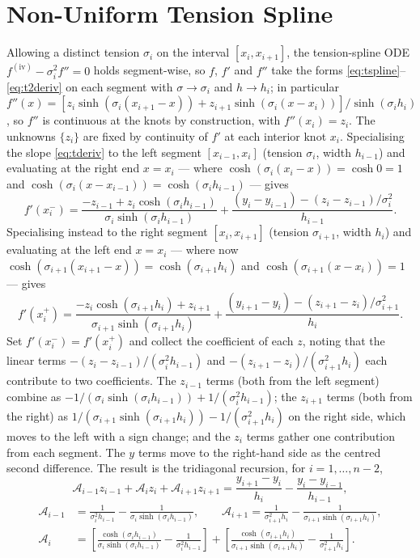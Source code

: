 \documentclass[]{interact}
\theoremstyle{plain}
\begin{document}
\section{Non-Uniform Tension Spline}\label{app:nonunif}
Allowing a distinct tension $\sigma_i$ on the interval $[x_i,x_{i+1}]$, the tension-spline ODE
$f^{(\mathrm{iv})}-\sigma_i^2 f''=0$ holds segment-wise, so $f$, $f'$ and $f''$ take the forms
\eqref{eq:tspline}--\eqref{eq:t2deriv} on each segment with $\sigma\!\to\!\sigma_i$ and
$h\!\to\!h_i$; in particular $f''(x)=[z_i\sinh(\sigma_i(x_{i+1}-x))+z_{i+1}\sinh(\sigma_i(x-x_i))]/\sinh(\sigma_i h_i)$,
so $f''$ is continuous at the knots by construction, with $f''(x_i)=z_i$. The unknowns
$\{z_i\}$ are fixed by continuity of $f'$ at each interior knot $x_i$. Specialising the slope
\eqref{eq:tderiv} to the left segment $[x_{i-1},x_i]$ (tension $\sigma_i$, width $h_{i-1}$) and
evaluating at the right end $x=x_i$ --- where $\cosh(\sigma_i(x_i-x))=\cosh 0=1$ and
$\cosh(\sigma_i(x-x_{i-1}))=\cosh(\sigma_i h_{i-1})$ --- gives
\[
f'(x_i^-)=\frac{-z_{i-1}+z_i\cosh(\sigma_i h_{i-1})}{\sigma_i\sinh(\sigma_i h_{i-1})}
+\frac{(y_i-y_{i-1})-(z_i-z_{i-1})/\sigma_i^2}{h_{i-1}} .
\]
Specialising instead to the right segment $[x_i,x_{i+1}]$ (tension $\sigma_{i+1}$, width $h_i$)
and evaluating at the left end $x=x_i$ --- where now $\cosh(\sigma_{i+1}(x_{i+1}-x))=\cosh(\sigma_{i+1}h_i)$
and $\cosh(\sigma_{i+1}(x-x_i))=1$ --- gives
\[
f'(x_i^+)=\frac{-z_i\cosh(\sigma_{i+1}h_i)+z_{i+1}}{\sigma_{i+1}\sinh(\sigma_{i+1}h_i)}
+\frac{(y_{i+1}-y_i)-(z_{i+1}-z_i)/\sigma_{i+1}^2}{h_i} .
\]
Set $f'(x_i^-)=f'(x_i^+)$ and collect the coefficient of each $z$, noting that the linear terms
$-(z_i-z_{i-1})/(\sigma_i^2 h_{i-1})$ and $-(z_{i+1}-z_i)/(\sigma_{i+1}^2 h_i)$ each contribute to
two coefficients. The $z_{i-1}$ terms (both from the left segment) combine as
$-1/(\sigma_i\sinh(\sigma_i h_{i-1}))+1/(\sigma_i^2 h_{i-1})$; the $z_{i+1}$ terms (both from the
right) as $1/(\sigma_{i+1}\sinh(\sigma_{i+1}h_i))-1/(\sigma_{i+1}^2 h_i)$ on the right side, which
moves to the left with a sign change; and the $z_i$ terms gather one contribution from each
segment. The $y$ terms move to the right-hand side as the centred second difference. The result
is the tridiagonal recursion, for $i=1,\dots,n-2$,
\begin{equation}
\mathcal{A}_{i-1}z_{i-1}+\mathcal{A}_i z_i+\mathcal{A}_{i+1}z_{i+1}
=\frac{y_{i+1}-y_i}{h_i}-\frac{y_i-y_{i-1}}{h_{i-1}},
\label{eq:nonunif}
\end{equation}
\begin{align}
\mathcal{A}_{i-1}&=\frac{1}{\sigma_i^2 h_{i-1}}-\frac{1}{\sigma_i\sinh(\sigma_i h_{i-1})},
\qquad
\mathcal{A}_{i+1}=\frac{1}{\sigma_{i+1}^2 h_i}-\frac{1}{\sigma_{i+1}\sinh(\sigma_{i+1}h_i)},\\
\mathcal{A}_i&=\left[\frac{\cosh(\sigma_i h_{i-1})}{\sigma_i\sinh(\sigma_i h_{i-1})}-\frac{1}{\sigma_i^2 h_{i-1}}\right]
+\left[\frac{\cosh(\sigma_{i+1}h_i)}{\sigma_{i+1}\sinh(\sigma_{i+1}h_i)}-\frac{1}{\sigma_{i+1}^2 h_i}\right].
\end{align}
\end{document}
